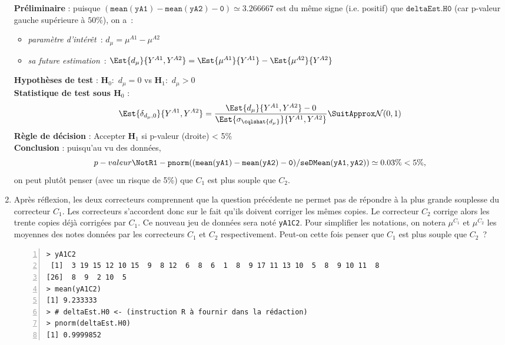 \documentclass[10pt]{report}
\begin{document}
\begin{exercice}
\begin{enumerate}
\begin{Correction}
\noindent \textbf{Préliminaire} : puisque $\mathtt{(mean(yA1)-mean(yA2)-0)}\simeq3.266667$ est du même signe (i.e. positif) que $\mathtt{deltaEst.H0}$ (car p-valeur gauche supérieure à $50\%$), on a~: 
      \begin{itemize}
\item \textit{paramètre d'intérêt}~: $d_\mu=\mu^{A1}-\mu^{A2}$
\item \textit{sa future estimation}~: $\Est{d_\mu}{Y^{A1},Y^{A2}}=\Est{\mu^{A1}}{Y^{A1}}-\Est{\mu^{A2}}{Y^{A2}}$
\end{itemize}
\noindent \textbf{Hypothèses de test} : $\mathbf{H}_0:$ $d_\mu=0$ vs {\large $\mathbf{H}_1:$ $d_\mu>0$}\\
\textbf{Statistique de test sous $\mathbf{H}_0$} :
  $$
  \Est{\delta_{d_\mu,0}}{Y^{A1},Y^{A2}}= {\displaystyle \frac{\Est{d_\mu}{Y^{A1},Y^{A2}}-0}{
\Est{\sigma_{\cqlshat{d_\mu}}}{Y^{A1},Y^{A2}}
}} 
  \SuitApprox \mathcal{N}(0,1)
  $$
\textbf{Règle de décision} : Accepter $\mathbf{H}_1$ si 
  p-valeur (droite) < 5\%\\
\noindent \textbf{Conclusion} :
puisqu'au vu des données, 
  \[
p-valeur\NotR\mathtt{1-pnorm((mean(yA1)-mean(yA2)-0)/seDMean(yA1,yA2))} \simeq 0.03\% < 5\%,
\]
on peut plutôt penser (avec un risque de 5\%) que $C_1$ est plus souple que $C_2$.
\end{Correction}





\item Après réflexion, les deux correcteurs comprennent que la question précédente ne permet pas de répondre à la plus grande souplesse du correcteur $C_1$. Les correcteurs s'accordent donc sur le fait qu'ils doivent corriger les mêmes copies. Le correcteur $C_2$ corrige alors les trente copies déjà corrigées par $C_1$. Ce nouveau jeu de données sera noté \texttt{yA1C2}. Pour simplifier les notations, on notera $\mu^{C_1}$ et $\mu^{C_2}$ les moyennes des notes données par les correcteurs $C_1$ et $C_2$ respectivement. Peut-on cette fois penser que $C_1$ est plus souple que $C_2$~?

\IndicR
\begin{Verbatim}[frame=leftline,fontfamily=tt,fontshape=n,numbers=left]
> yA1C2
 [1]  3 19 15 12 10 15  9  8 12  6  8  6  1  8  9 17 11 13 10  5  8  9 10 11  8
[26]  8  9  2 10  5
> mean(yA1C2)
[1] 9.233333
> # deltaEst.H0 <- (instruction R à fournir dans la rédaction)
> pnorm(deltaEst.H0)
[1] 0.9999852
\end{Verbatim}


\end{enumerate}
\end{exercice}
\end{document}
